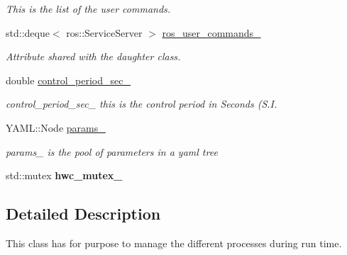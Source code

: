 \begin{DoxyCompactItemize}
\begin{DoxyCompactList}\small\item\em This is the list of the user commands. \end{DoxyCompactList}\item 
std\+::deque$<$ ros\+::\+Service\+Server $>$ \hyperlink{classdynamic__graph_1_1DynamicGraphManager_a0fb35bc44f331db3570c09b75b49cd15}{ros\+\_\+user\+\_\+commands\+\_\+}
\begin{DoxyCompactList}\small\item\em Attribute shared with the daughter class. \end{DoxyCompactList}\item 
double \hyperlink{classdynamic__graph_1_1DynamicGraphManager_a2c0f1323534e9e1b17f3b1cc23f0c7f1}{control\+\_\+period\+\_\+sec\+\_\+}
\begin{DoxyCompactList}\small\item\em control\+\_\+period\+\_\+sec\+\_\+ this is the control period in Seconds (S.\+I. \end{DoxyCompactList}\item 
Y\+A\+M\+L\+::\+Node \hyperlink{classdynamic__graph_1_1DynamicGraphManager_ad3773835c294117a500af96d272921ea}{params\+\_\+}\hypertarget{classdynamic__graph_1_1DynamicGraphManager_ad3773835c294117a500af96d272921ea}{}\label{classdynamic__graph_1_1DynamicGraphManager_ad3773835c294117a500af96d272921ea}

\begin{DoxyCompactList}\small\item\em params\+\_\+ is the pool of parameters in a yaml tree \end{DoxyCompactList}\item 
std\+::mutex {\bfseries hwc\+\_\+mutex\+\_\+}\hypertarget{classdynamic__graph_1_1DynamicGraphManager_a1b7d9df75790d22b3258e1bd42fd537d}{}\label{classdynamic__graph_1_1DynamicGraphManager_a1b7d9df75790d22b3258e1bd42fd537d}

\end{DoxyCompactItemize}


\subsection{Detailed Description}
This class has for purpose to manage the different processes during run time. 

